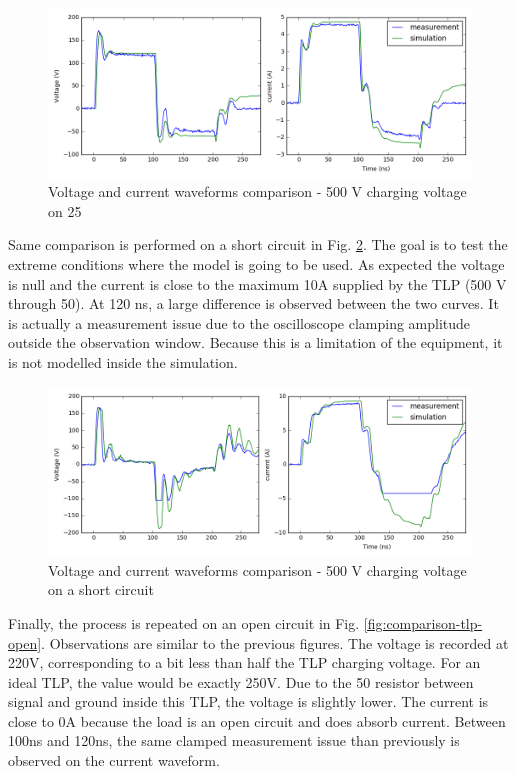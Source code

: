 \begin{figure}[!h]
  \centering
  \includegraphics[width=\textwidth]{src/2/figures/tlp_comparison_R25_500V.png}
  \caption{Voltage and current waveforms comparison - 500 V charging voltage on 25\textOmega{}}
  \label{fig:comparison-tlp-load}
\end{figure}

Same comparison is performed on a short circuit in Fig. \ref{fig:comparison-tlp-short}.
The goal is to test the extreme conditions where the model is going to be used.
As expected the voltage is null and the current is close to the maximum 10A supplied by the TLP (500 V through 50\textOmega{}).
At 120 ns, a large difference is observed between the two curves.
It is actually a measurement issue due to the oscilloscope clamping amplitude outside the observation window.
Because this is a limitation of the equipment, it is not modelled inside the simulation.

\begin{figure}[!h]
  \centering
  \includegraphics[width=\textwidth]{src/2/figures/tlp_comparison_short_500V.png}
  \caption{Voltage and current waveforms comparison - 500 V charging voltage on a short circuit}
  \label{fig:comparison-tlp-short}
\end{figure}

Finally, the process is repeated on an open circuit in Fig. \ref{fig:comparison-tlp-open}.
Observations are similar to the previous figures.
The voltage is recorded at 220V, corresponding to a bit less than half the TLP charging voltage.
For an ideal TLP, the value would be exactly 250V.
Due to the 50\textOmega{} resistor between signal and ground inside this TLP, the voltage is slightly lower.
The current is close to 0A because the load is an open circuit and does absorb current.
Between 100ns and 120ns, the same clamped measurement issue than previously is observed on the current waveform.


